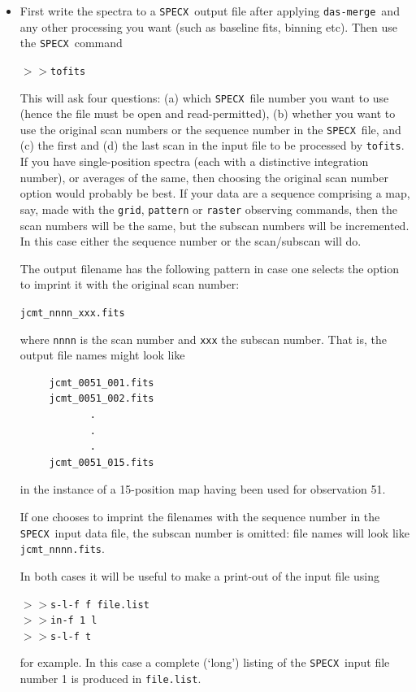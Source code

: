 \documentclass[11pt,twoside]{article}
\newcommand{\SPECX}{{\tt SPECX}}
\newcommand{\dm}{{\tt das-merge}}
\newcommand{\SP}{{$>\!>$}}
\begin{document}
\begin{itemize}
\item
First write the spectra to a \SPECX\ output file after applying \dm\
and any other processing you want (such as baseline fits, binning
etc). Then use the
\SPECX\ command

\SP \verb|tofits|

This will ask four questions: (a) which \SPECX\ file number you want
to use (hence the file must be open and read-permitted), (b) whether
you want to use the original scan numbers or the sequence number in
the \SPECX\ file, and (c) the first and (d) the last scan in the input
file to be processed by {\tt tofits}. If you have single-position
spectra (each with a distinctive integration number), or averages of
the same, then choosing the original scan number option would
probably be best. If your data are a sequence comprising a map, say, made with
the {\tt grid}, {\tt pattern} or {\tt raster} observing commands, then
the scan numbers will be the same, but the subscan numbers will be
incremented. In this case either the sequence number or the
scan/subscan will do.

The output filename has the following pattern in case one selects the
option to imprint it with the original scan number:

\verb|jcmt_nnnn_xxx.fits|

where {\tt nnnn} is the scan number and {\tt xxx} the subscan
number. That is, the output file names might look like
\begin{verbatim}
     jcmt_0051_001.fits
     jcmt_0051_002.fits
            .
            .
            .
     jcmt_0051_015.fits
\end{verbatim}
in the instance of a 15-position map having been used for observation
51.

If one chooses to imprint the filenames with the sequence number in
the \SPECX\ input data file, the subscan number is omitted: file names
will look like
\verb|jcmt_nnnn.fits|.

In both cases it will be useful to make a print-out of the input file
using

\SP \verb|s-l-f f file.list|\\
\SP \verb|in-f 1 l|\\
\SP \verb|s-l-f t|

for example. In this case a complete (`long') listing of the \SPECX\
input file number 1 is produced in {\tt file.list}.


\end{itemize}
\end{document}
